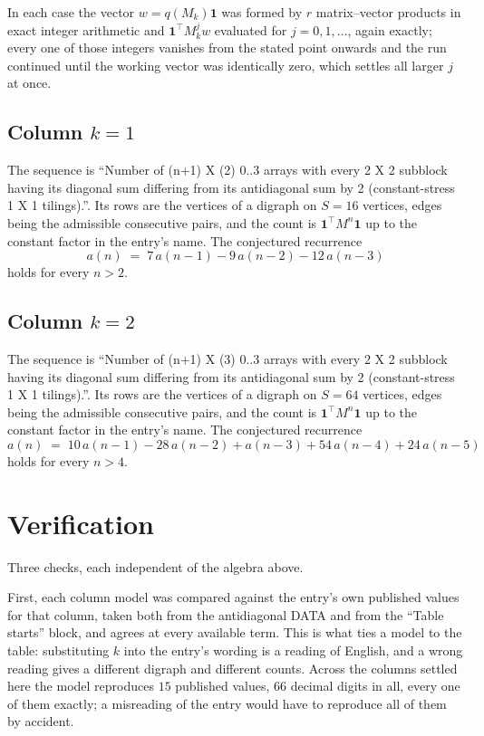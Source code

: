 \documentclass[11pt,a4paper]{article}
\theoremstyle{plain}
\theoremstyle{definition}
\begin{document}
In each case the vector $w=q(M_k)\mathbf{1}$ was formed by $r$ matrix--vector products in
exact integer arithmetic and $\mathbf{1}^{\!\top}M_k^{j}w$ evaluated for $j=0,1,\dots$,
again exactly; every one of those integers vanishes from the stated point onwards and the run
continued until the working vector was identically zero, which settles all larger $j$ at once.

\subsection*{Column $k=1$}
The sequence is ``Number of (n+1) X (2) 0..3 arrays with every 2 X 2 subblock having its diagonal sum differing from its antidiagonal sum by 2 (constant-stress 1 X 1 tilings).''. Its rows are the vertices of a digraph on
$S=16$ vertices, edges being the admissible consecutive pairs, and the count is
$\mathbf{1}^{\!\top}M^{n}\mathbf{1}$ up to the constant factor in the entry's name.
The conjectured recurrence
\[
a(n)\;=\;7\,a(n-1) - 9\,a(n-2) - 12\,a(n-3)
\]
holds for every $n>2$.

\subsection*{Column $k=2$}
The sequence is ``Number of (n+1) X (3) 0..3 arrays with every 2 X 2 subblock having its diagonal sum differing from its antidiagonal sum by 2 (constant-stress 1 X 1 tilings).''. Its rows are the vertices of a digraph on
$S=64$ vertices, edges being the admissible consecutive pairs, and the count is
$\mathbf{1}^{\!\top}M^{n}\mathbf{1}$ up to the constant factor in the entry's name.
The conjectured recurrence
\[
a(n)\;=\;10\,a(n-1) - 28\,a(n-2) + a(n-3) + 54\,a(n-4) + 24\,a(n-5)
\]
holds for every $n>4$.

\section{Verification}

Three checks, each independent of the algebra above.

First, each column model was compared against the entry's own published values for that
column, taken both from the antidiagonal DATA and from the ``Table starts'' block, and agrees
at every available term. This is what ties a model to the table: substituting $k$ into the
entry's wording is a reading of English, and a wrong reading gives a different digraph and
different counts. Across the columns settled here the model reproduces $15$ published
values, $66$ decimal digits in all, every one of them exactly; a misreading of the entry
would have to reproduce all of them by accident.
\end{document}
